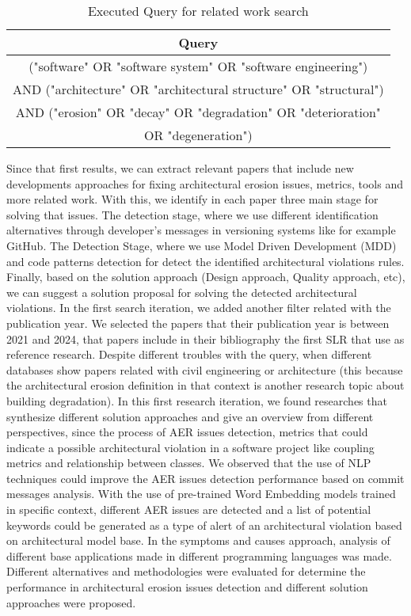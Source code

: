 \begin{table}[H]
    \centering
    \begin{tabular}{|c|}
        \hline
        Query\\
         \hline
             ("software" OR "software system" OR "software engineering") \\
             AND ("architecture" OR "architectural structure" OR "structural") \\
             AND ("erosion" OR "decay" OR "degradation" OR "deterioration"\\
             OR "degeneration") \\
         \hline
    \end{tabular}
    \caption{Executed Query for related work search}
    \label{tab:my_label}
\end{table}

Since that first results, we can extract relevant papers that include new developments approaches for fixing architectural erosion issues, metrics, tools and more related work. With this, we identify in each paper three main stage for solving that issues. The detection stage, where we use different identification alternatives through developer's messages in versioning systems like for example GitHub. The Detection Stage, where we use Model Driven Development (MDD) and code patterns detection for detect the identified architectural violations rules. Finally, based on the solution approach (Design approach, Quality approach, etc), we can suggest a solution proposal for solving the detected architectural violations.
In the first search iteration, we added another filter related with the publication year. We selected the papers that their publication year is between 2021 and 2024, that papers include in their bibliography the first SLR that use as reference research. Despite different troubles with the query, when different databases show papers related with civil engineering or architecture (this because the architectural erosion definition in that context is another research topic about building degradation). In this first research iteration, we found researches that synthesize different solution approaches and give an overview from different perspectives, since the process of AER issues detection, metrics that could indicate a possible architectural violation in a software project like coupling metrics and relationship between classes.
We observed that the use of NLP techniques could improve the AER issues detection performance based on commit messages analysis. With the use of pre-trained Word Embedding models trained in specific context, different AER issues are detected and a list of potential keywords could be generated as a type of alert of an architectural violation based on architectural model base.
In the symptoms and causes approach, analysis of different base applications made in different programming languages was made. Different alternatives and methodologies were evaluated for determine the performance in architectural erosion issues detection and different solution approaches were proposed.





